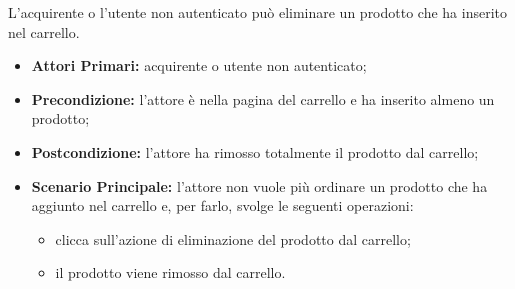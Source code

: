 
L'acquirente o l'utente non autenticato può eliminare un prodotto che ha inserito nel carrello.
\begin{itemize}
    \item \textbf{Attori Primari:} acquirente o utente non autenticato;
    \item \textbf{Precondizione:} l'attore è nella pagina del carrello e ha inserito almeno un prodotto;
    \item \textbf{Postcondizione:} l'attore ha rimosso totalmente il prodotto dal carrello;
    \item \textbf{Scenario Principale:} l'attore non vuole più ordinare un prodotto che ha aggiunto nel carrello e, per farlo, svolge le seguenti operazioni:
    \begin{itemize}
        \item clicca sull'azione di eliminazione del prodotto dal carrello;
        \item il prodotto viene rimosso dal carrello.
    \end{itemize}
\end{itemize}




